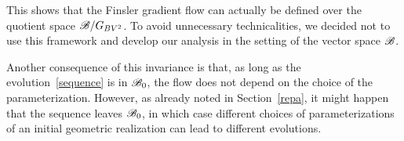 This shows that the Finsler gradient flow can actually be defined over the quotient space
$\mathcal{B}/G_{BV^2}$. To avoid unnecessary technicalities, we decided not to use this framework and develop our analysis in the setting of the vector space $\mathcal{B}$.

Another consequence of this invariance is that, as long as the evolution~\eqref{sequence} is in $\mathcal{B}_0$, the flow does not depend on the choice of the parameterization. However, as already noted in Section~\ref{repa}, it might happen that the sequence leaves $\mathcal{B}_0$, in which case different choices of parameterizations of an initial geometric realization can lead to different evolutions. 







